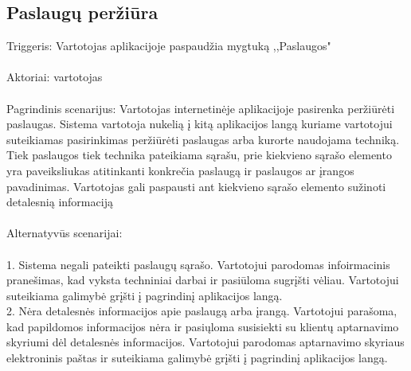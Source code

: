 \documentclass[oneside]{VUMIFPSkursinis}
\begin{document}
\subsection{Paslaugų peržiūra}
	Triggeris: Vartotojas aplikacijoje paspaudžia mygtuką ,,Paslaugos"\\ \\
	Aktoriai: vartotojas\\ \\
	Pagrindinis scenarijus: Vartotojas internetinėje aplikacijoje pasirenka peržiūrėti paslaugas. Sistema vartotoja nukelią į kitą aplikacijos langą kuriame vartotojui suteikiamas pasirinkimas peržiūrėti paslaugas arba kurorte naudojama techniką. Tiek paslaugos tiek technika pateikiama sąrašu, prie kiekvieno sąrašo elemento yra paveiksliukas atitinkanti konkrečia paslaugą ir paslaugos ar įrangos pavadinimas. Vartotojas gali paspausti ant kiekvieno sąrašo elemento sužinoti detalesnią informaciją\\ \\
Alternatyvūs scenarijai:\\ \\
1. Sistema negali pateikti paslaugų sąrašo. Vartotojui parodomas infoirmacinis pranešimas, kad vyksta techniniai darbai ir pasiūloma sugrįšti vėliau. Vartotojui suteikiama galimybė grįšti į pagrindinį aplikacijos langą.\\
2. Nėra detalesnės informacijos apie paslaugą arba įrangą. Vartotojui parašoma, kad papildomos informacijos nėra ir pasiųloma susisiekti su klientų aptarnavimo skyriumi dėl detalesnės informacijos. Vartotojui parodomas aptarnavimo skyriaus elektroninis paštas ir suteikiama galimybė grįšti į pagrindinį aplikacijos langą.
\end{document}
